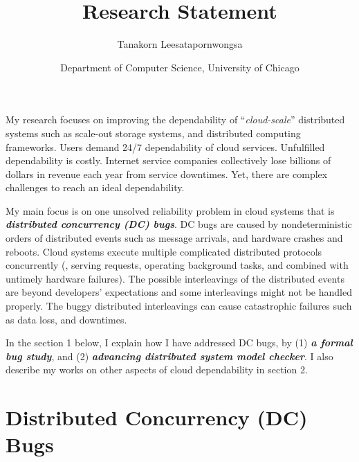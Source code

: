 \documentclass[11pt]{article}
\begin{document}
\title{Research Statement}
\author{Tanakorn Leesatapornwongsa}
\date{\vspace{-1ex} \small{Department of Computer Science, University of
Chicago}}

\maketitle

My research focuses on improving the dependability of ``\textit{cloud-scale}''
distributed systems such as scale-out storage systems, and distributed computing
frameworks. Users demand 24/7 dependability of
cloud services. Unfulfilled dependability is costly. Internet service companies
collectively lose billions of dollars in revenue each year from service
downtimes. Yet, there are complex challenges to reach an ideal dependability. 

My main focus is on one unsolved reliability problem in cloud systems that is
\textbf{\textit{distributed concurrency (DC) bugs}}. DC bugs are caused by
nondeterministic orders of distributed events such as message arrivals, and
hardware crashes and reboots. Cloud systems execute multiple complicated
distributed protocols concurrently (\eg, serving requests, operating
background tasks, and combined with untimely hardware failures). The possible
interleavings of the distributed events are beyond developers' expectations and
some interleavings might not be handled properly. The buggy distributed
interleavings can cause catastrophic failures such as data loss, and downtimes.

In the section 1 below, I explain how I have addressed DC bugs, by (1)
\textit{\textbf{a formal bug study}}, and (2) \textit{\textbf{advancing
distributed system model checker}}. I also describe my works on other aspects
of cloud dependability in section 2.


\section{Distributed Concurrency (DC) Bugs}\label{dcbugs}

\end{document}
